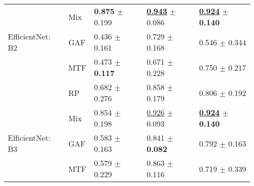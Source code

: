 \begin{tabular}{lllll}
 & Mix & \textbf{\textcolor[rgb]{0.0000000000,0.5000000000,0}{0.875}} $\pm$ \textcolor[rgb]{0.4665064146,0.5000000000,0}{0.199} & \underline{\textbf{\textcolor[rgb]{0.0000000000,0.5000000000,0}{0.943}}} $\pm$ \textcolor[rgb]{0.0279362560,0.5000000000,0}{0.086} & \underline{\textbf{\textcolor[rgb]{0.0000000000,0.5000000000,0}{0.924}}} $\pm$ \textbf{\textcolor[rgb]{0.0000000000,0.5000000000,0}{0.140}} \\
EfficientNet: B2 & GAF & \textcolor[rgb]{1.0000000000,0.0000000000,0}{0.436} $\pm$ \textcolor[rgb]{0.2469583423,0.5000000000,0}{0.161} & \textcolor[rgb]{0.7854363535,0.2145636465,0}{0.729} $\pm$ \textcolor[rgb]{0.5902943363,0.4097056637,0}{0.168} & \textcolor[rgb]{1.0000000000,0.0000000000,0}{0.546} $\pm$ \textcolor[rgb]{1.0000000000,0.0000000000,0}{0.344} \\
 & MTF & \textcolor[rgb]{0.9165707710,0.0834292290,0}{0.473} $\pm$ \textbf{\textcolor[rgb]{0.0000000000,0.5000000000,0}{0.117}} & \textcolor[rgb]{1.0000000000,0.0000000000,0}{0.671} $\pm$ \textcolor[rgb]{1.0000000000,0.0000000000,0}{0.228} & \textcolor[rgb]{0.4601226994,0.5000000000,0}{0.750} $\pm$ \textcolor[rgb]{0.3761612393,0.5000000000,0}{0.217} \\
 & RP & \textcolor[rgb]{0.4401611047,0.5000000000,0}{0.682} $\pm$ \textcolor[rgb]{0.8992700104,0.1007299896,0}{0.276} & \textcolor[rgb]{0.3122568093,0.5000000000,0}{0.858} $\pm$ \textcolor[rgb]{0.6588583971,0.3411416029,0}{0.179} & \textcolor[rgb]{0.3128834356,0.5000000000,0}{0.806} $\pm$ \textcolor[rgb]{0.2583340082,0.5000000000,0}{0.192} \\
 & Mix & \textcolor[rgb]{0.0474683544,0.5000000000,0}{0.854} $\pm$ \textcolor[rgb]{0.4597706474,0.5000000000,0}{0.198} & \underline{\textcolor[rgb]{0.0612840467,0.5000000000,0}{0.926}} $\pm$ \textcolor[rgb]{0.0757608281,0.5000000000,0}{0.093} & \underline{\textbf{\textcolor[rgb]{0.0000000000,0.5000000000,0}{0.924}}} $\pm$ \textbf{\textcolor[rgb]{0.0000000000,0.5000000000,0}{0.140}} \\
EfficientNet: B3 & GAF & \textcolor[rgb]{0.6645569620,0.3354430380,0}{0.583} $\pm$ \textcolor[rgb]{0.2594721826,0.5000000000,0}{0.163} & \textcolor[rgb]{0.3747081712,0.5000000000,0}{0.841} $\pm$ \textbf{\textcolor[rgb]{0.0000000000,0.5000000000,0}{0.082}} & \textcolor[rgb]{0.3496932515,0.5000000000,0}{0.792} $\pm$ \textcolor[rgb]{0.1148593217,0.5000000000,0}{0.163} \\
 & MTF & \textcolor[rgb]{0.6740506329,0.3259493671,0}{0.579} $\pm$ \textcolor[rgb]{0.6342803047,0.3657196953,0}{0.229} & \textcolor[rgb]{0.2951639800,0.5000000000,0}{0.863} $\pm$ \textcolor[rgb]{0.2289898021,0.5000000000,0}{0.116} & \textcolor[rgb]{0.5429447853,0.4570552147,0}{0.719} $\pm$ \textcolor[rgb]{0.9763816031,0.0236183969,0}{0.339} \\

\end{tabular}
